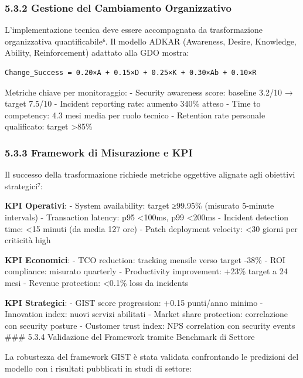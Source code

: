 \documentclass[12pt,a4paper,oneside]{book}
\begin{document}
\subsubsection{5.3.2 Gestione del Cambiamento
Organizzativo}\label{gestione-del-cambiamento-organizzativo}

L'implementazione tecnica deve essere accompagnata da trasformazione
organizzativa quantificabile⁶. Il modello ADKAR (Awareness, Desire,
Knowledge, Ability, Reinforcement) adattato alla GDO mostra:

\begin{verbatim}
Change_Success = 0.20×A + 0.15×D + 0.25×K + 0.30×Ab + 0.10×R
\end{verbatim}

Metriche chiave per monitoraggio: - Security awareness score: baseline
3.2/10 → target 7.5/10 - Incident reporting rate: aumento 340\% atteso -
Time to competency: 4.3 mesi media per ruolo tecnico - Retention rate
personale qualificato: target \textgreater85\%

\subsubsection{5.3.3 Framework di Misurazione e
KPI}\label{framework-di-misurazione-e-kpi}

Il successo della trasformazione richiede metriche oggettive alignate
agli obiettivi strategici⁷:

\textbf{KPI Operativi}: - System availability: target ≥99.95\% (misurato
5-minute intervals) - Transaction latency: p95 \textless100ms, p99
\textless200ms - Incident detection time: \textless15 minuti (da media
127 ore) - Patch deployment velocity: \textless30 giorni per criticità
high

\textbf{KPI Economici}: - TCO reduction: tracking mensile verso target
-38\% - ROI compliance: misurato quarterly - Productivity improvement:
+23\% target a 24 mesi - Revenue protection: \textless0.1\% loss da
incidents

\textbf{KPI Strategici}: - GIST score progression: +0.15 punti/anno
minimo - Innovation index: nuovi servizi abilitati - Market share
protection: correlazione con security posture - Customer trust index:
NPS correlation con security events \#\#\# 5.3.4 Validazione del
Framework tramite Benchmark di Settore

La robustezza del framework GIST è stata validata confrontando le
predizioni del modello con i risultati pubblicati in studi di settore:
\end{document}
